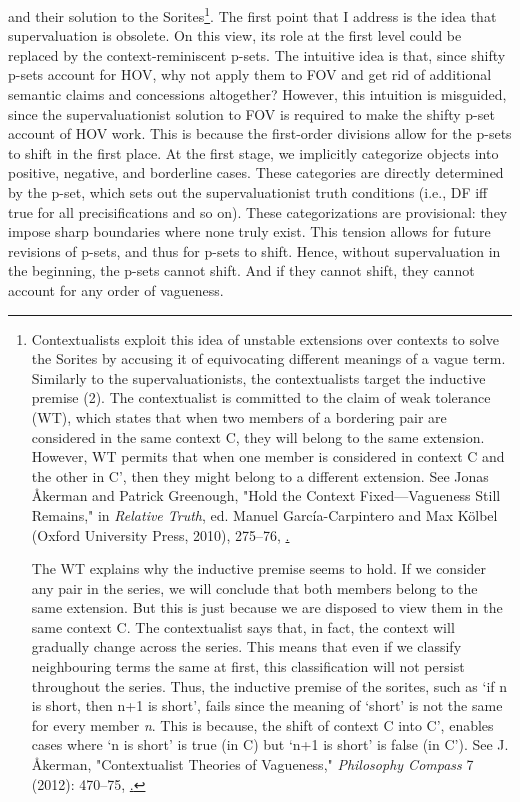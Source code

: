 and their solution to the Sorites\footnote{Contextualists exploit this
  idea of unstable extensions over contexts to solve the Sorites by
  accusing it of equivocating different meanings of a vague term.
  Similarly to the supervaluationists, the contextualists target the
  inductive premise (2). The contextualist is committed to the claim of
  weak tolerance (WT), which states that when two members of a bordering
  pair are considered in the same context C, they will belong to the
  same extension. However, WT permits that when one member is considered
  in context C and the other in C', then they might belong to a
  different extension. See Jonas Åkerman and Patrick Greenough, "Hold
  the Context Fixed---Vagueness Still Remains," in \emph{Relative
  Truth}, ed. Manuel García-Carpintero and Max Kölbel (Oxford University
  Press, 2010), 275--76,
  \href{https://doi.org/10.1093/acprof:oso/9780199570386.003.0016}.

  The WT explains why the inductive premise seems to hold. If we
  consider any pair in the series, we will conclude that both members
  belong to the same extension. But this is just because we are disposed
  to view them in the same context C. The contextualist says that, in
  fact, the context will gradually change across the series. This means
  that even if we classify neighbouring terms the same at first, this
  classification will not persist throughout the series. Thus, the
  inductive premise of the sorites, such as `if n is short, then n+1 is
  short', fails since the meaning of `short' is not the same for every
  member \emph{n}. This is because, the shift of context C into C',
  enables cases where `n is short' is true (in C) but `n+1 is short' is
  false (in C'). See J. Åkerman, "Contextualist Theories of Vagueness,"
  \emph{Philosophy Compass} 7 (2012): 470--75,
  \href{https://doi.org/10.1111/j.1747-9991.2012.00495.x}.}.
The first point that I address is the idea that supervaluation is
obsolete. On this view, its role at the first level could be replaced by
the context-reminiscent p-sets. The intuitive idea is that, since shifty
p-sets account for HOV, why not apply them to FOV and get rid of
additional semantic claims and concessions altogether? However, this
intuition is misguided, since the supervaluationist solution to FOV is
required to make the shifty p-set account of HOV work. This is because
the first-order divisions allow for the p-sets to shift in the first
place. At the first stage, we implicitly categorize objects into
positive, negative, and borderline cases. These categories are directly
determined by the p-set, which sets out the supervaluationist truth
conditions (i.e., DF iff true for all precisifications and so on). These
categorizations are provisional: they impose sharp boundaries where none
truly exist. This tension allows for future revisions of p-sets, and
thus for p-sets to shift. Hence, without supervaluation in the
beginning, the p-sets cannot shift. And if they cannot shift, they
cannot account for any order of vagueness.

